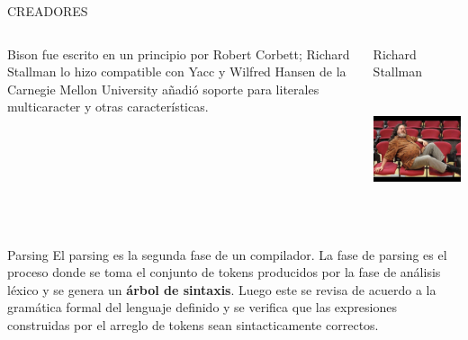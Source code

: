 \documentclass[10pt]{beamer}
\begin{document}
\begin{frame}[fragile]{CREADORES} 
    \begin{columns}[T] 
        \begin{column}{.5\textwidth} 
            \begin{block}{ } 
                Bison fue escrito en un principio por Robert Corbett; Richard Stallman lo hizo 
                compatible con Yacc y Wilfred Hansen de la Carnegie Mellon University añadió soporte 
                para literales multicaracter y otras características. 
            \end{block} 
        \end{column} 
        \begin{column}{.5\textwidth} 
            \begin{block}{Richard Stallman} 
                \includegraphics[width=6cm,height=4cm]{stallman} 
            \end{block} 
        \end{column} 
    \end{columns} 
\end{frame} 

\begin{frame}[fragile]{Parsing} 
    El parsing es la segunda fase de un compilador. La fase de parsing es el proceso donde se toma 
    el conjunto de tokens producidos por la fase de análisis léxico y se genera un 
    \textbf{árbol de sintaxis}. Luego este se revisa de acuerdo a la gramática formal del 
    lenguaje definido y se verifica que las expresiones construidas por el arreglo de tokens 
    sean sintacticamente correctos. \newline 
\end{frame} 
\end{document}

